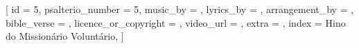 

[
    id                     = {5},
    psalterio_number       = {5},
    music_by               = {},
    lyrics_by              = {},
    arrangement_by         = {},
    bible_verse            = {},
    licence_or_copyright   = {},
    video_url              = {},
    extra                  = {},
    index                  = {Hino do Missionário Voluntário},
]


\beginverse
                       
